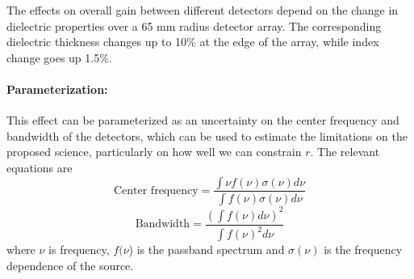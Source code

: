 The effects on overall gain between different detectors depend on the change in dielectric properties over a 65 mm radius detector array. The corresponding dielectric thickness changes up to 10\% at the edge of the array, while index change goes up 1.5\%.

\paragraph{Parameterization:}
This effect can be parameterized as an uncertainty on the center frequency and bandwidth of the detectors, which can be used to estimate the limitations on the proposed science, particularly on how well we can constrain $r$. The relevant equations are
\begin{equation}
\textrm{Center frequency} = \frac{\int \nu f(\nu) \sigma(\nu) d\nu}{\int f(\nu) \sigma(\nu) d\nu}
\end{equation}
\begin{equation}
\textrm{Bandwidth} = \frac{(\int f(\nu) d\nu)^2}{\int f(\nu) ^2 d\nu}
\end{equation}
where $\nu$ is frequency, $f(\nu$) is the passband spectrum and $\sigma (\nu)$ is the frequency dependence of the source.
